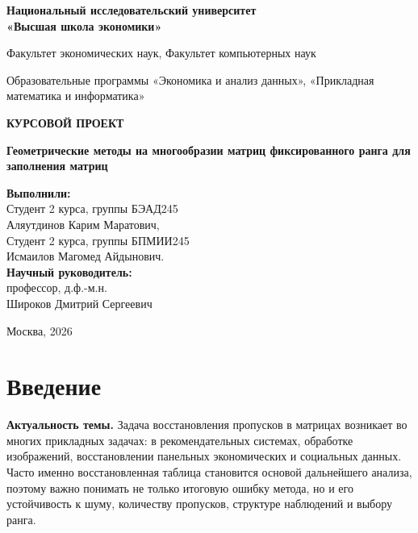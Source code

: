 \documentclass[a4paper,12pt]{article}
\begin{document}
\begin{titlepage}
    \centering
    {\large\bfseries Национальный исследовательский университет\\
    «Высшая школа экономики»\par}
    \vspace{1cm}
    {\large Факультет экономических наук, Факультет компьютерных наук\par}
    {\large Образовательные программы «Экономика и анализ данных», «Прикладная математика и информатика»\par}
    \vspace{2cm}
    {\Large\bfseries КУРСОВОЙ ПРОЕКТ\par}
    \vspace{1cm}
    {\Large\bfseries Геометрические методы на многообразии матриц фиксированного ранга для заполнения матриц\par}
    \vspace{2cm}
    \begin{flushright}
        \large
        \textbf{Выполнили:}\\
        Студент 2 курса, группы БЭАД245\\
        Аляутдинов Карим Маратович,\\
        Студент 2 курса, группы БПМИИ245\\
        Исмаилов Магомед Айдынович.\\
        \vspace{0.5cm}
        \textbf{Научный руководитель:}\\
        профессор, д.ф.-м.н.\\
        Широков Дмитрий Сергеевич\\
    \end{flushright}
    \vfill
    {\large Москва, 2026\par}
\end{titlepage}

\tableofcontents
\newpage

\section*{Введение}
{}


\textbf{Актуальность темы.} Задача восстановления пропусков в матрицах возникает во многих прикладных задачах: в рекомендательных системах, обработке изображений, восстановлении панельных экономических и социальных данных. Часто именно восстановленная таблица становится основой дальнейшего анализа, поэтому важно понимать не только итоговую ошибку метода, но и его устойчивость к шуму, количеству пропусков, структуре наблюдений и выбору ранга.
\end{document}
